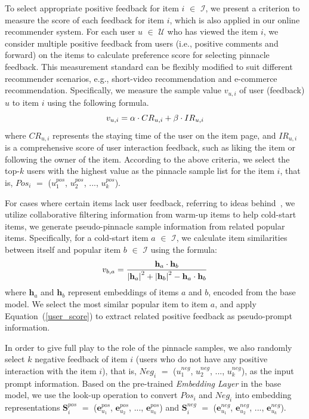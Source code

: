 \documentclass[sigconf]{acmart}
\begin{document}
To select appropriate positive feedback for item $i$ $\in$ $\mathcal{I}$, we present a criterion to measure the score of each feedback for item $i$, which is also applied in our online recommender system. 
For each user $u$ $\in$ $\mathcal{U}$ who has viewed the item $i$, we consider multiple positive feedback from users (i.e., positive comments and forward) on the items to calculate preference score for selecting pinnacle feedback.
This measurement standard can be flexibly modified to suit different recommender scenarios, e.g., short-video recommendation and e-commerce recommendation. 
Specifically, we measure the sample value $v_{u, i}$ of user (feedback) $u$ to item $i$ using the following formula.
\begin{equation} \small
\label{user_score}
v_{u, i}= \alpha \cdot CR_{u, i} + \beta \cdot IR_{u, i}
\end{equation}
where $CR_{u, i}$ represents the staying time of the user on the item page, and $IR_{u, i}$ is a comprehensive score of user interaction feedback, such as liking the item or following the owner of the item. 
According to the above criteria, we select the top-$k$ users with the highest value as the pinnacle sample list for the item $i$, that is, $Pos_i$ $=$ ($u_1^{pos}$, $u_2^{pos}$, ..., $u_k^{pos}$).

For cases where certain items lack user feedback, referring to ideas behind~\cite{barkan2019cb2cf}, we utilize collaborative filtering information from warm-up items to help cold-start items, we generate pseudo-pinnacle sample information from related popular items. Specifically, for a cold-start item $a$ $\in$ $\mathcal{I}$, we calculate item similarities between itself and popular item $b$ $\in$ $\mathcal{I}$ using the formula:
\begin{equation} \small
v_{b, a}=\frac{\mathbf{h}_{a} \cdot \mathbf{h}_{b}}{\left|\mathbf{h}_{a}\right|^2+\left|\mathbf{h}_{b}\right|^2-\mathbf{h}_{a} \cdot \mathbf{h}_{b}}
\end{equation}
where $\mathbf{h}_{a}$ and $\mathbf{h}_{b}$ represent embeddings of items $a$ and $b$, encoded from the base model. 
We select the most similar popular item to item $a$, and apply Equation~(\ref{user_score}) to extract related positive feedback as pseudo-prompt information.

In order to give full play to the role of the pinnacle samples, we also randomly select $k$ negative feedback of item $i$ (users who do not have any positive interaction with the item $i$), that is, $Neg_i$ $=$ ($u_1^{neg}$, $u_2^{neg}$, ..., $u_k^{neg}$), as the input prompt information. 
Based on the pre-trained \textit{Embedding Layer} in the base model, we use the look-up operation to convert $Pos_i$ and $Neg_i$ into embedding representations $\mathbf{S}_i^{pos}$ $=$ ($\mathbf{e}_{u_1}^{pos}$, $\mathbf{e}_{u_2}^{pos}$, ..., $\mathbf{e}_{u_k}^{pos}$) and $\mathbf{S}_i^{neg}$ $=$ ($\mathbf{e}_{u_1}^{neg}$, $\mathbf{e}_{u_2}^{neg}$, ..., $\mathbf{e}_{u_k}^{neg}$).
\end{document}
